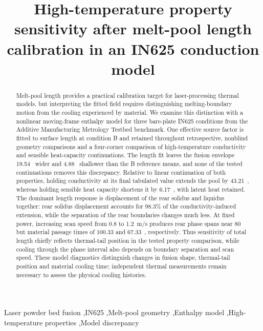 \begin{frontmatter}
\title{High-temperature property sensitivity after melt-pool length calibration in an IN625 conduction model}
\begin{abstract}
Melt-pool length provides a practical calibration target for laser-processing thermal models, but interpreting the fitted field requires distinguishing melting-boundary motion from the cooling experienced by material.
We examine this distinction with a nonlinear moving-frame enthalpy model for three bare-plate IN625 conditions from the Additive Manufacturing Metrology Testbed benchmark.
One effective source factor is fitted to surface length at condition B and retained throughout retrospective, nonblind geometry comparisons and a four-corner comparison of high-temperature conductivity and sensible heat-capacity continuations.
The length fit leaves the fusion envelope 19.54~\um{} wider and 4.88~\um{} shallower than the B reference means, and none of the tested continuations removes this discrepancy.
Relative to linear continuation of both properties, holding conductivity at its final tabulated value extends the pool by 43.21~\um{}, whereas holding sensible heat capacity shortens it by 6.17~\um{}, with latent heat retained.
The dominant length response is displacement of the rear solidus and liquidus together: rear solidus displacement accounts for 98.3\% of the conductivity-induced extension, while the separation of the rear boundaries changes much less.
At fixed power, increasing scan speed from 0.8 to 1.2~m/s produces rear phase spans near 80~\um{} but material passage times of 100.33 and 67.33~\us{}, respectively.
Thus sensitivity of total length chiefly reflects thermal-tail position in the tested property comparison, while cooling through the phase interval also depends on boundary separation and scan speed.
These model diagnostics distinguish changes in fusion shape, thermal-tail position and material cooling time; independent thermal measurements remain necessary to assess the physical cooling histories.
\end{abstract}
\begin{keyword}
Laser powder bed fusion \sep IN625 \sep Melt-pool geometry \sep Enthalpy model \sep High-temperature properties \sep Model discrepancy
\end{keyword}
\end{frontmatter}

